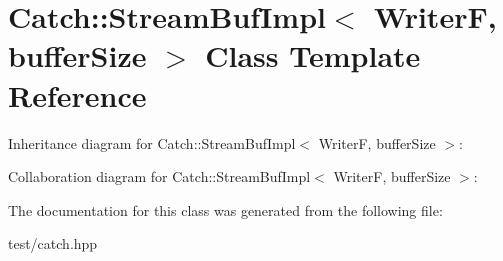 \hypertarget{classCatch_1_1StreamBufImpl}{}\section{Catch\+:\+:Stream\+Buf\+Impl$<$ WriterF, buffer\+Size $>$ Class Template Reference}
\label{classCatch_1_1StreamBufImpl}


Inheritance diagram for Catch\+:\+:Stream\+Buf\+Impl$<$ WriterF, buffer\+Size $>$\+:


Collaboration diagram for Catch\+:\+:Stream\+Buf\+Impl$<$ WriterF, buffer\+Size $>$\+:


The documentation for this class was generated from the following file\+:\begin{DoxyCompactItemize}
\item 
test/catch.\+hpp\end{DoxyCompactItemize}
